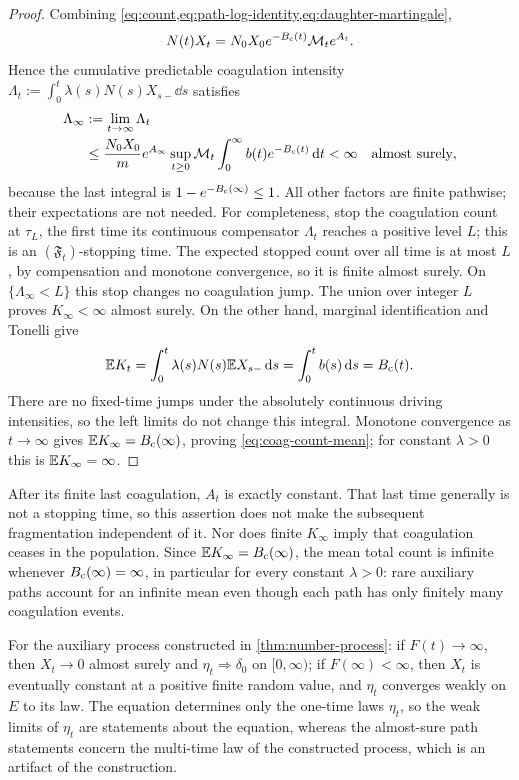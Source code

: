 \begin{proof}
Combining \cref{eq:count,eq:path-log-identity,eq:daughter-martingale},
\[
 N(t)X_t=N_0X_0e^{-B_{\mathrm c}(t)}\mathcal M_t e^{A_t}.
\]
Hence the cumulative predictable coagulation intensity
$\Lambda_t:=\int_0^t\lambda(s)N(s)X_{s-}\dd s$ satisfies
\begin{align}
 \Lambda_\infty&:=\lim_{t\to\infty}\Lambda_t\notag\\
 &\leq\frac{N_0X_0}{m}e^{A_\infty}
       \sup_{t\geq0}\mathcal M_t
       \int_0^\infty b(t)e^{-B_{\mathrm c}(t)}\,\mathrm d t<\infty
       \quad\text{almost surely},
 \label{eq:finite-coag-hazard}
\end{align}
because the last integral is $1-e^{-B_{\mathrm c}(\infty)}\leq1$.
All other factors are finite pathwise; their expectations are not needed.
For completeness, stop the coagulation count at $\tau_L$, the first
time its continuous compensator $\Lambda_t$ reaches a positive level
$L$; this is an $(\mathfrak F_t)$-stopping time. The expected stopped
count over all time is at most $L$, by compensation and monotone
convergence, so it is finite almost surely. On
$\{\Lambda_\infty<L\}$ this stop changes no coagulation jump.
The union over integer $L$ proves $K_\infty<\infty$ almost surely.
On the other hand, marginal identification and Tonelli give
\[
 \mathbb E K_t=\int_0^t\lambda(s)N(s)\mathbb E X_{s-}\,\mathrm d s
       =\int_0^t b(s)\,\mathrm d s=B_{\mathrm c}(t).
\]
There are no fixed-time jumps under the absolutely continuous
driving intensities, so the left limits do not change this integral.
Monotone convergence as $t\to\infty$ gives $\mathbb E K_\infty=B_{\mathrm c}(\infty)$,
proving \eqref{eq:coag-count-mean}; for constant $\lambda>0$ this
is $\mathbb E K_\infty=\infty$.
\end{proof}

After its finite last coagulation, $A_t$ is exactly constant. That last
time generally is not a stopping time, so this assertion does not make
the subsequent fragmentation independent of it. Nor does finite
$K_\infty$ imply that coagulation ceases in the population. Since
$\mathbb E K_\infty=B_{\mathrm c}(\infty)$, the mean total count is infinite whenever
$B_{\mathrm c}(\infty)=\infty$, in particular for every constant $\lambda>0$:
rare auxiliary paths account for an infinite mean even though each
path has only finitely many coagulation events.

\begin{corollary}
\label{cor:controlled-size}
For the auxiliary process constructed in \cref{thm:number-process}:
if $F(t)\to\infty$, then $X_t\to0$ almost surely and
$\eta_t\Rightarrow\delta_0$ on $[0,\infty)$; if $F(\infty)<\infty$,
then $X_t$ is eventually constant at a positive finite random value,
and $\eta_t$ converges weakly on $E$ to its law.
The equation determines only the one-time laws $\eta_t$, so the
weak limits of $\eta_t$ are statements about the equation, whereas
the almost-sure path statements concern the multi-time law of the
constructed process, which is an artifact of the construction.
\end{corollary}

